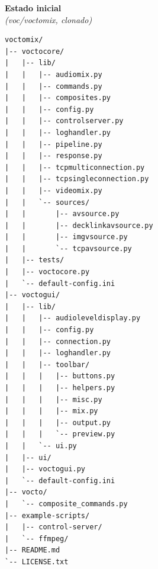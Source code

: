 \noindent%
\begin{minipage}[t]{0.47\textwidth}
  {\centering\small\textbf{Estado inicial}\\[2pt]\small\textit{(voc/voctomix, clonado)}\par}
  \vspace{0.15cm}
  \scriptsize
  \begin{verbatim}
voctomix/
|-- voctocore/
|   |-- lib/
|   |   |-- audiomix.py
|   |   |-- commands.py
|   |   |-- composites.py
|   |   |-- config.py
|   |   |-- controlserver.py
|   |   |-- loghandler.py
|   |   |-- pipeline.py
|   |   |-- response.py
|   |   |-- tcpmulticonnection.py
|   |   |-- tcpsingleconnection.py
|   |   |-- videomix.py
|   |   `-- sources/
|   |       |-- avsource.py
|   |       |-- decklinkavsource.py
|   |       |-- imgvsource.py
|   |       `-- tcpavsource.py
|   |-- tests/
|   |-- voctocore.py
|   `-- default-config.ini
|-- voctogui/
|   |-- lib/
|   |   |-- audioleveldisplay.py
|   |   |-- config.py
|   |   |-- connection.py
|   |   |-- loghandler.py
|   |   |-- toolbar/
|   |   |   |-- buttons.py
|   |   |   |-- helpers.py
|   |   |   |-- misc.py
|   |   |   |-- mix.py
|   |   |   |-- output.py
|   |   |   `-- preview.py
|   |   `-- ui.py
|   |-- ui/
|   |-- voctogui.py
|   `-- default-config.ini
|-- vocto/
|   `-- composite_commands.py
|-- example-scripts/
|   |-- control-server/
|   `-- ffmpeg/
|-- README.md
`-- LICENSE.txt
  \end{verbatim}
\end{minipage}%
\hfill%
